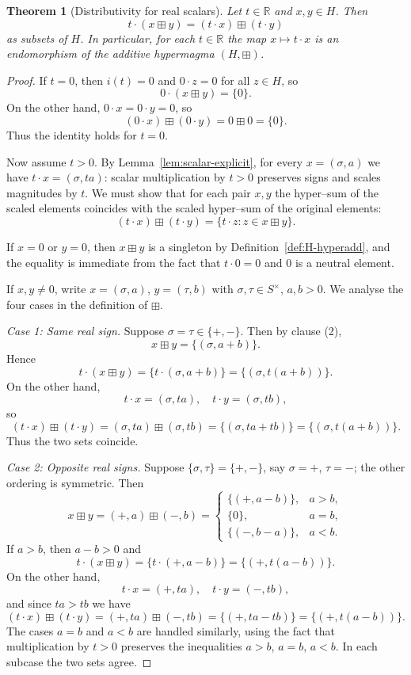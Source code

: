 \documentclass[10pt,a4paper]{amsart}
\newtheorem{theorem}{Theorem}
\newcommand{\Hnum}{H}                      %
\newcommand{\R}{\mathbb{R}}
\newcommand{\Snon}{S^{\times}}             %
\newcommand{\iemb}{i}                      %
\newcommand{\op}{\boxplus}                 %
\begin{document}
\begin{theorem}[Distributivity for real scalars]
\label{thm:scalar-Rge0}
Let $t\in\R$ and $x,y\in\Hnum$.  Then
\[
  t\cdot(x\op y) = (t\cdot x)\op(t\cdot y)
\]
as subsets of $\Hnum$.  In particular, for each $t\in\R$ the map
$x\mapsto t\cdot x$ is an endomorphism of the additive hypermagma
$(\Hnum,\op)$.
\end{theorem}

\begin{proof}
If $t=0$, then $\iemb(t)=0$ and $0\cdot z=0$ for all $z\in\Hnum$, so
\[
  0\cdot(x\op y) = \{0\}.
\]
On the other hand, $0\cdot x=0\cdot y=0$, so
\[
  (0\cdot x)\op(0\cdot y) = 0\op 0 = \{0\}.
\]
Thus the identity holds for $t=0$.

Now assume $t>0$.  By Lemma~\ref{lem:scalar-explicit}, for every
$x=(\sigma,a)$ we have $t\cdot x=(\sigma,ta)$: scalar multiplication by
$t>0$ preserves signs and scales magnitudes by $t$.  We must show that
for each pair $x,y$ the hyper–sum of the scaled elements coincides with
the scaled hyper–sum of the original elements:
\[
  (t\cdot x)\op(t\cdot y)
  = \{t\cdot z : z\in x\op y\}.
\]

If $x=0$ or $y=0$, then $x\op y$ is a singleton by
Definition~\ref{def:H-hyperadd}, and the equality is immediate from
the fact that $t\cdot 0=0$ and $0$ is a neutral element.

If $x,y\ne0$, write $x=(\sigma,a)$, $y=(\tau,b)$ with
$\sigma,\tau\in\Snon$, $a,b>0$.  We analyse the four cases in the
definition of $\op$.

\smallskip\noindent
\emph{Case 1: Same real sign.}  Suppose $\sigma=\tau\in\{+,-\}$.  Then
by clause (2),
\[
  x\op y = \{(\sigma,a+b)\}.
\]
Hence
\[
  t\cdot(x\op y)
  = \{t\cdot(\sigma,a+b)\}
  = \{(\sigma,t(a+b))\}.
\]
On the other hand,
\[
  t\cdot x = (\sigma,ta),\quad
  t\cdot y = (\sigma,tb),
\]
so
\[
  (t\cdot x)\op(t\cdot y)
  = (\sigma,ta)\op(\sigma,tb)
  = \{(\sigma,ta+tb)\}
  = \{(\sigma,t(a+b))\}.
\]
Thus the two sets coincide.

\smallskip\noindent
\emph{Case 2: Opposite real signs.}  Suppose $\{\sigma,\tau\}=\{+,-\}$,
say $\sigma=+$, $\tau=-$; the other ordering is symmetric.  Then
\[
  x\op y
  = (+,a)\op(-,b)
  =
  \begin{cases}
    \{(+,a-b)\}, & a>b,\\[2pt]
    \{0\},       & a=b,\\[2pt]
    \{(-,b-a)\}, & a<b.
  \end{cases}
\]
If $a>b$, then $a-b>0$ and
\[
  t\cdot(x\op y)
  = \{t\cdot(+,a-b)\}
  = \{(+,t(a-b))\}.
\]
On the other hand,
\[
  t\cdot x = (+,ta),\quad
  t\cdot y = (-,tb),
\]
and since $ta>tb$ we have
\[
  (t\cdot x)\op(t\cdot y)
  = (+,ta)\op(-,tb)
  = \{(+,ta-tb)\}
  = \{(+,t(a-b))\}.
\]
The cases $a=b$ and $a<b$ are handled similarly, using the fact that
multiplication by $t>0$ preserves the inequalities $a>b$, $a=b$,
$a<b$.  In each subcase the two sets agree.


\end{proof}
\end{document}
